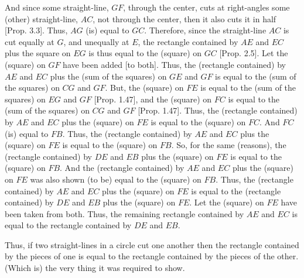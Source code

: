 \begin{Parallel}{}{}
{And since some straight-line, $GF$, through the center, cuts at right-angles  some (other) straight-line, $AC$, not through the center,  then it also cuts
it in half [Prop. 3.3]. Thus, $AG$ (is) equal to $GC$. Therefore,
since the straight-line $AC$ is cut equally at $G$, and unequally at $E$,
the rectangle contained by $AE$ and $EC$ plus the square on $EG$ is thus
equal to the (square) on $GC$ [Prop. 2.5]. Let the (square) on
$GF$ have been added [to both]. Thus, the (rectangle contained) by 
$AE$ and $EC$ plus the (sum of the squares) on $GE$ and $GF$ is equal to
the (sum of the squares) on $CG$ and $GF$. But, the (square) on $FE$ is equal to the (sum of the squares)
on $EG$ and $GF$   [Prop. 1.47],
and the (square)
on $FC$  is equal to the (sum of the squares) on $CG$ and $GF$ [Prop. 1.47]. Thus, the (rectangle contained) by
$AE$ and $EC$ plus the (square) on $FE$ is equal to the (square) on $FC$.
And $FC$ (is) equal to $FB$. Thus, the (rectangle contained) by
$AE$ and $EC$ plus the (square) on $FE$ is equal to the (square) on $FB$.
So, for the same (reasons), the (rectangle contained) by
$DE$ and $EB$ plus the (square) on $FE$ is equal to the (square) on $FB$.
And the (rectangle contained) by
$AE$ and $EC$ plus the (square) on $FE$ was also shown (to be) equal to the (square) on $FB$. Thus,  the (rectangle contained) by
$AE$ and $EC$ plus the (square) on $FE$ is equal to the (rectangle contained) by
$DE$ and $EB$ plus the (square) on $FE$. Let the (square) on $FE$ have been
taken from both. Thus, the remaining rectangle contained by $AE$ and
$EC$ is equal to the rectangle contained by $DE$ and $EB$.

Thus, if two straight-lines in a circle cut one another then the rectangle
contained by the pieces of one is equal to the rectangle contained
by the pieces of the other. (Which is) the very thing it was required to
show.}
\end{Parallel}

